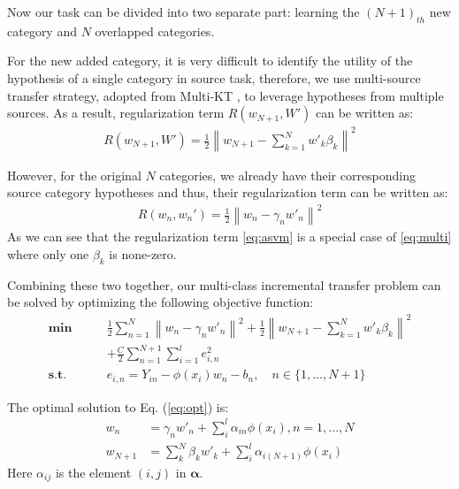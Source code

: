 Now our task can be divided into two separate part: learning the $(N+1)_{th}$ new category and $N$ overlapped categories.

For the new added category, it is very difficult to identify the utility of the hypothesis of a single category in source task, therefore, we use multi-source transfer strategy, adopted from Multi-KT \cite{tommasi2014learning}, to leverage hypotheses from multiple sources. As a result, regularization term $R(w_{N+1},W')$ can be written as:
\begin{equation}
\begin{aligned}
R(w_{N+1},W')= \frac{1}{2}{\left\| {{w_{N + 1}} - \sum\limits_{k = 1}^N {w{'_k}{\beta _k}} } \right\|^2} 
\end{aligned}\label{eq:multi}
\end{equation}


However, for the original $N$ categories, we already have their corresponding source category hypotheses and thus, their regularization term can be written as:
\begin{equation}\label{eq:asvm}
\begin{aligned}
R(w_n,w_n')= \frac{1}{2}{{{\left\| {{w_n} - {\gamma _n}{{w'}_n}} \right\|}^2}}  
\end{aligned}
\end{equation}
As we can see that the regularization term \eqref{eq:asvm} is a special case of \eqref{eq:multi} where only one $\beta_k$ is none-zero. 

Combining these two together, our multi-class incremental transfer problem can be solved by optimizing the following objective function:
\begin{equation}
\begin{aligned}
\textbf{min}\qquad {} & \frac{1}{2}\sum\limits_{n = 1}^N {{{\left\| {{w_n} - {\gamma _n}{{w'}_n}} \right\|}^2}}  + \frac{1}{2}{\left\| {{w_{N + 1}} - \sum\limits_{k = 1}^N {w{'_k}{\beta _k}} } \right\|^2}\\& +\frac{C}{2}\sum\limits_{n = 1}^{N + 1} {\sum\limits_{i = 1}^l {e_{i,n}^2} }  \\
\textbf{s.t.}\qquad {} &{e_{i,n}} = {Y_{in}} - \phi ({x_i}){w_n} - {b_n}, \quad n \in \{1,...,N+1\}
\end{aligned}\label{eq:opt}
\end{equation}

The optimal solution to  Eq. (\ref{eq:opt}) is:
\begin{equation}\label{eq:solu}
\begin{aligned}
{w_n}&= {\gamma _n}{{w'}_n} + \sum\limits_i^l {{\alpha _{in}}{\phi(x_i)}} ,{n = 1,...,N}\\
{w_{N + 1}}&= \sum\limits_k^N {{\beta _k}{{w'}_k}}  + \sum\limits_i^l {{\alpha _{i(N + 1)}}{\phi(x_i)}} 
\end{aligned}
\end{equation}
Here $\alpha_{ij}$ is the element $(i,j)$ in $\boldsymbol{\alpha}$. 

